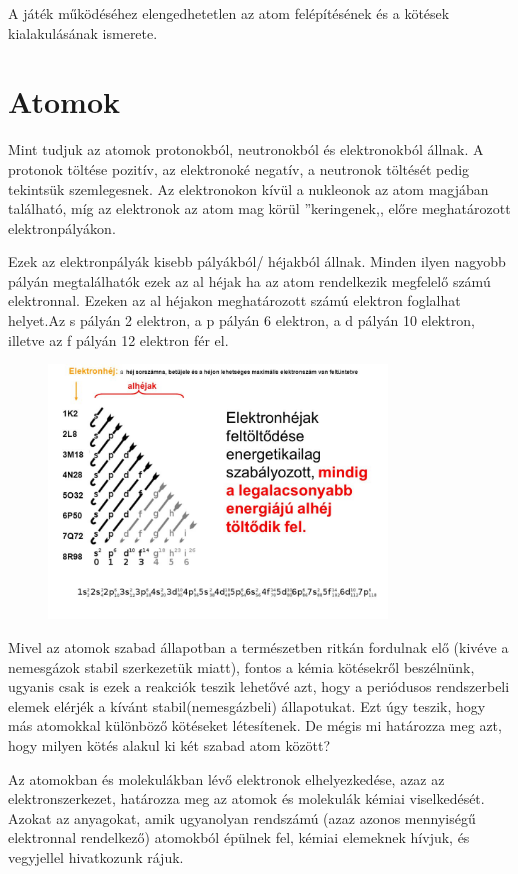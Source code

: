 \documentclass[colorlinks]{thesis-ekf}
\theoremstyle{definition}
\theoremstyle{remark}
\begin{document}
A játék működéséhez elengedhetetlen az atom felépítésének és a kötések kialakulásának ismerete. 
\section{Atomok}
Mint tudjuk az atomok protonokból, neutronokból és elektronokból állnak. A protonok töltése pozitív, az elektronoké negatív, a neutronok töltését pedig tekintsük szemlegesnek. Az elektronokon kívül a nukleonok az atom magjában található, míg az elektronok az atom mag körül ''keringenek,, előre meghatározott elektronpályákon.

Ezek az elektronpályák kisebb pályákból/ héjakból állnak. Minden ilyen nagyobb pályán megtalálhatók ezek az al héjak ha az atom rendelkezik megfelelő számú elektronnal. Ezeken az al héjakon meghatározott számú elektron foglalhat helyet.Az s pályán 2 elektron, a p pályán 6 elektron, a d pályán 10 elektron, illetve az f pályán 12 elektron fér el.\cite{sulinet_elektronpályák}
\begin{figure}[!ht]
	\centering
	\includegraphics[width=9cm]{elektronszerkezet}
	\caption{\cite{img_elektronkonfig}}\label{elektronszerkezet}
\end{figure}

Mivel az atomok szabad állapotban a természetben ritkán fordulnak elő (kivéve a nemesgázok stabil szerkezetük miatt), fontos a kémia kötésekről beszélnünk, ugyanis csak is ezek a reakciók teszik lehetővé azt, hogy a periódusos rendszerbeli elemek elérjék a kívánt stabil(nemesgázbeli) állapotukat. Ezt úgy teszik, hogy más atomokkal különböző kötéseket létesítenek.\cite{ionos_vidi} De mégis mi határozza meg azt, hogy milyen kötés alakul ki két szabad atom között?

Az atomokban és molekulákban lévő elektronok elhelyezkedése, azaz az elektronszerkezet, határozza meg az atomok és molekulák kémiai viselkedését.\cite{wiki_e_szerk}
Azokat az anyagokat, amik ugyanolyan rendszámú (azaz azonos mennyiségű elektronnal rendelkező) atomokból épülnek fel, kémiai elemeknek hívjuk, és vegyjellel hivatkozunk rájuk.\cite{periodusos_ppt} 
\end{document}
